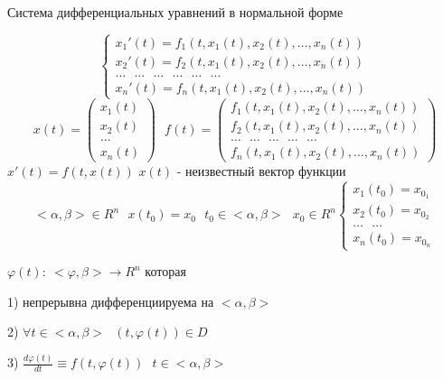 \begin{title}[\Large]
  Система дифференциальных уравнений в нормальной форме
\end{title}

\begin{define}
  $$
  \left\{
  \begin{array}{l}
    x_1'(t) = f_1(t, x_1(t), x_2(t), \ldots, x_n(t)) \\
    x_2'(t) = f_2(t, x_1(t), x_2(t), \ldots, x_n(t)) \\
    \ldots ~~~ \ldots ~~~ \ldots ~~~ \ldots ~~~ \ldots ~~~ \ldots \\
    x_n'(t) = f_n(t, x_1(t), x_2(t), \ldots, x_n(t))
  \end{array}
  \right.
  $$
  $$
  x(t) =
  \left(
  \begin{array}{l}
    x_1(t) \\
    x_2(t) \\
    \ldots \\
    x_n(t)
  \end{array}
  \right) ~~~
  f(t) =
  \left(
  \begin{array}{l}
   f_1(t, x_1(t), x_2(t), \ldots, x_n(t)) \\
   f_2(t, x_1(t), x_2(t), \ldots, x_n(t)) \\
    \ldots ~~~ \ldots ~~~ \ldots ~~~ \ldots ~~~ \ldots \\
   f_n(t, x_1(t), x_2(t), \ldots, x_n(t))
  \end{array}
  \right)
  $$
  $x'(t) = f(t, x(t))$ $x(t)$ - неизвестный вектор функции
  $$
  <\alpha, \beta> \in R^n ~~~ x(t_0) = x_0 ~~~ t_0 \in <\alpha, \beta> ~~~
  x_0 \in R^n
  \left\{
  \begin{array}{l}
    x_1(t_0) = x_{0_1} \\
    x_2(t_0) = x_{0_2} \\
    \ldots ~~~ \ldots \\
    x_n(t_0) = x_{0_n}
  \end{array}
  \right.
  $$
\end{define}

\begin{block}
  $\varphi(t): ~ <\varphi, \beta> \to R^n$ которая

  1) непрерывна дифференциируема на $<\alpha, \beta>$

  2) $\forall t \in <\alpha, \beta> ~~~ (t, \varphi(t)) \in D$

  3) $\frac{d\varphi(t)}{dt} \equiv f(t, \varphi(t)) ~~~
  t \in <\alpha, \beta>$
\end{block}

